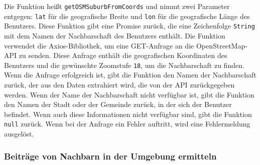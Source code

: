 Die Funktion heißt \texttt{getOSMSuburbFromCoords} und nimmt zwei Parameter entgegen: \texttt{lat} für die geografische Breite und \texttt{lon} für die geografische Länge des Benutzers. Diese Funktion gibt eine Promise zurück, die eine Zeichenfolge \texttt{String} mit dem Namen der Nachbarschaft des Benutzers enthält. Die Funktion verwendet die Axios-Bibliothek, um eine GET-Anfrage an die OpenStreetMap-API zu senden. Diese Anfrage enthält die geografischen Koordinaten des Benutzers und die gewünschte Zoomstufe \texttt{18}, um die Nachbarschaft zu finden. Wenn die Anfrage erfolgreich ist, gibt die Funktion den Namen der Nachbarschaft zurück, der aus den Daten extrahiert wird, die von der API zurückgegeben werden. Wenn der Name der Nachbarschaft nicht verfügbar ist, gibt die Funktion den Namen der Stadt oder der Gemeinde zurück, in der sich der Benutzer befindet. Wenn auch diese Informationen nicht verfügbar sind, gibt die Funktion \texttt{null} zurück. Wenn bei der Anfrage ein Fehler auftritt, wird eine Fehlermeldung ausgelöst.


\subsubsection{Beiträge von Nachbarn in der Umgebung ermitteln}

